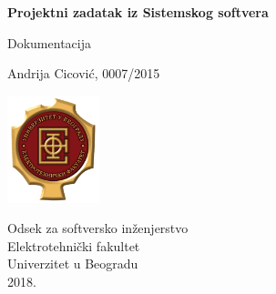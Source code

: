 \begin{titlepage}
    \begin{center}

        \vspace*{1cm}

        \Huge
        \textbf{Projektni zadatak iz Sistemskog softvera}

        \vspace{0.5cm}
        \LARGE
        Dokumentacija

        \vspace{1.5cm}
        \Large
        Andrija Cicović, 0007/2015

        \vfill

        \includegraphics[width=0.2\textwidth]{etflogo}

        \large
        Odsek za softversko inženjerstvo\\
        Elektrotehnički fakultet\\
        Univerzitet u Beogradu\\
        2018.

    \end{center}
\end{titlepage}

